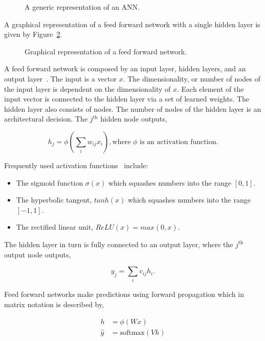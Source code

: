 \begin{figure}[!htbp]
    \centering
    
    \caption{A generic representation of an ANN.}\label{fig:ann}
\end{figure}

A graphical representation of a feed forward network with a single hidden layer
is given by Figure~\ref{fig:feedforward_network}.

\begin{figure}[!htbp]
    \centering
    
    \caption{Graphical representation of a feed forward network.}\label{fig:feedforward_network}
\end{figure}

A feed forward network is composed by an input layer, hidden layers, and an
output layer~\cite{Jain1996, Krose1993}. The input is a vector \(x\). The dimensionality, or
number of nodes of the input layer is dependent on the dimensionality of \(x\).
Each element of the input vector is connected to the hidden layer via a set of
learned weights. The hidden layer also consists of nodes. The number of
nodes of the hidden layer is an architectural decision. The \(j^{\text{th}}\)
hidden node outputs,

\[h_j = \phi (\sum_{i} w_{ij} x_{i}), \text{where } \phi  \text{ is an activation function}.\]

Frequently used activation functions~\cite{Karlik2011, Krose1993} include:

\begin{itemize}
    \item The sigmoid function \(\sigma(x)\) which squashes numbers into the range \([0, 1]\).
    \item The hyperbolic tangent, \(tanh(x)\) which squashes numbers into the range \([-1, 1]\).
    \item The rectified linear unit, \(ReLU(x)=max(0,x)\).
\end{itemize}

The hidden layer in turn is fully connected to an output layer, where the
\(j^{\text{th}}\) output node outputs,

\[y_{j} = \sum_{i} v_{ij} h_{i}.\]

Feed forward networks make predictions using forward propagation which in matrix
notation is described by,

\begin{align}\label{eq:neural_network_equations}
h & = \phi(Wx) \\ \label{eq:neural_network_equations_two}
\hat{y} & = \text{softmax}(Vh)
\end{align}

